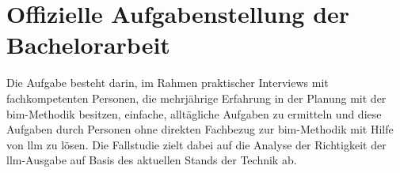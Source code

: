 \chapter*{\textbf{Offizielle Aufgabenstellung der Bachelorarbeit}}
\label{chap:task}

Die Aufgabe besteht darin, im Rahmen praktischer Interviews mit fachkompetenten Personen, die mehrjährige Erfahrung
in der Planung mit der \gls{bim}-Methodik besitzen, einfache, alltägliche Aufgaben zu ermitteln und diese Aufgaben durch
Personen ohne direkten Fachbezug zur \gls{bim}-Methodik mit Hilfe von \gls{llm} zu lösen. Die Fallstudie
zielt dabei auf die Analyse der Richtigkeit der \gls{llm}-Ausgabe auf Basis des aktuellen Stands der Technik ab.
